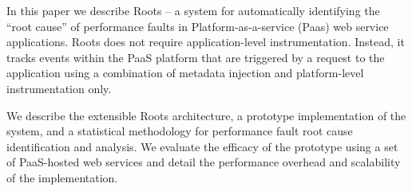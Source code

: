 In this paper we describe Roots -- a system for automatically identifying the
``root cause'' of performance faults in Platform-as-a-service (Paas)
web service applications.  Roots does not require
application-level instrumentation.  Instead, it tracks events within the PaaS
platform that are triggered by a request to the application using a
combination of metadata injection and platform-level instrumentation only.

We describe the extensible Roots architecture, a prototype implementation 
of the system, and a statistical methodology for performance fault
root cause identification and analysis.  We evaluate the efficacy of the
prototype using a set of PaaS-hosted web services and detail the performance
overhead and scalability of the implementation.

